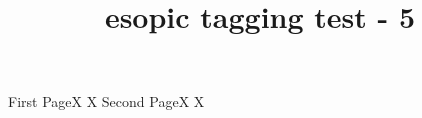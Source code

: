 \documentclass[a4paper,twoside]{article}
\title{esopic tagging test - 5}
\begin{document}
  \Huge \bfseries

\hrulefill First Page\hrulefill \vfill X \hfill X \newpage
\hrulefill  Second Page\hrulefill \vfill X \hfill X
\end{document}

